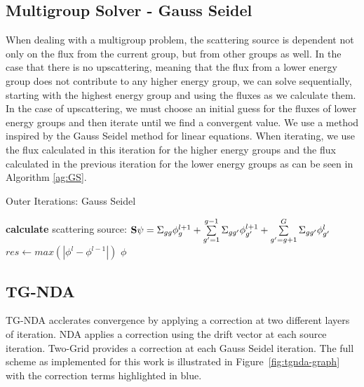 \subsection{Multigroup Solver - Gauss Seidel}
When dealing with a multigroup problem, the scattering source is dependent not only on the flux from the current group, but from other groups as well. In the case that there is no upscattering, meaning that the flux from a lower energy group does not contribute to any higher energy group, we can solve sequentially, starting with the highest energy group and using the fluxes as we calculate them. In the case of upscattering, we must choose an initial guess for the fluxes of lower energy groups and then iterate until we find a convergent value. We use a method inspired by the Gauss Seidel method for linear equations. 
When iterating, we use the flux calculated in this iteration for the higher energy groups and the flux calculated in the previous iteration for the lower energy groups as can be seen in Algorithm \ref{ag:GS}.
\begin{algorithm}
\caption{Outer Iterations: Gauss Seidel}
\begin{algorithmic}
     
            \State \textbf{calculate} scattering source: \State $ {\bf S} \psi = \Sigma_{gg}\phi_g^{l+1} + \sum\limits_{g'=1}^{g-1} \Sigma_{gg'} \phi_{g'}^{l+1} + \sum\limits_{g'=g+1}^G \Sigma_{gg'}\phi_{g'}^l$
        \EndProcedure
        \EndFor
        \State $res \gets max(|\phi^{l} - \phi^{l-1}|)$  
        \EndWhile
    \Return $\phi$
\end{algorithmic}
\label{ag:GS}
\end{algorithm}

\subsection{TG-NDA}
TG-NDA acclerates convergence by applying a correction at two different layers of iteration. NDA applies a correction using the drift vector at each source iteration. Two-Grid provides a correction at each Gauss Seidel iteration. The full scheme as implemented for this work is illustrated in Figure~\ref{fig:tgnda-graph} with the correction terms highlighted in blue. 


